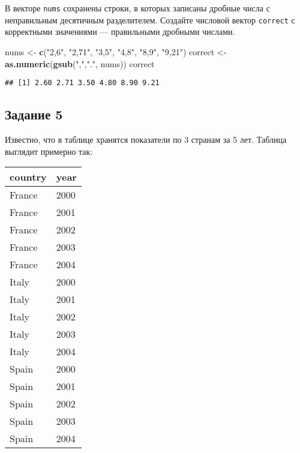 \documentclass[
]{article}
\newenvironment{Shaded}{\begin{snugshade}}{\end{snugshade}}
\newcommand{\KeywordTok}[1]{\textcolor[rgb]{0.13,0.29,0.53}{\textbf{#1}}}
\newcommand{\NormalTok}[1]{#1}
\newcommand{\StringTok}[1]{\textcolor[rgb]{0.31,0.60,0.02}{#1}}
\begin{document}
В векторе \texttt{nums} сохранены строки, в которых записаны дробные
числа с неправильным десятичным разделителем. Создайте числовой вектор
\texttt{correct} с корректными значениями --- правильными дробными
числами.

\begin{Shaded}
\begin{Highlighting}[]
\NormalTok{nums <-}\StringTok{ }\KeywordTok{c}\NormalTok{(}\StringTok{"2,6"}\NormalTok{, }\StringTok{"2,71"}\NormalTok{, }\StringTok{"3,5"}\NormalTok{, }\StringTok{"4,8"}\NormalTok{, }\StringTok{"8,9"}\NormalTok{, }\StringTok{"9,21"}\NormalTok{)}
\NormalTok{correct <-}\StringTok{ }\KeywordTok{as.numeric}\NormalTok{(}\KeywordTok{gsub}\NormalTok{(}\StringTok{","}\NormalTok{,}\StringTok{"."}\NormalTok{, nums)) }
\NormalTok{correct}
\end{Highlighting}
\end{Shaded}

\begin{verbatim}
## [1] 2.60 2.71 3.50 4.80 8.90 9.21
\end{verbatim}

\hypertarget{ux437ux430ux434ux430ux43dux438ux435-5}{%
\subsection{Задание 5}\label{ux437ux430ux434ux430ux43dux438ux435-5}}

Известно, что в таблице хранятся показатели по 3 странам за 5 лет.
Таблица выглядит примерно так:

\begin{table}[]
\centering
\begin{tabular}{|l|l|}
\hline
\textbf{country} & \textbf{year} \\ \hline
France           & 2000          \\ \hline
France           & 2001          \\ \hline
France           & 2002          \\ \hline
France           & 2003          \\ \hline
France           & 2004          \\ \hline
Italy            & 2000          \\ \hline
Italy            & 2001          \\ \hline
Italy            & 2002          \\ \hline
Italy            & 2003          \\ \hline
Italy            & 2004          \\ \hline
Spain            & 2000          \\ \hline
Spain            & 2001          \\ \hline
Spain            & 2002          \\ \hline
Spain            & 2003          \\ \hline
Spain            & 2004          \\ \hline
\end{tabular}
\end{table}
\end{document}
